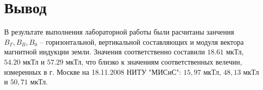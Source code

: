 \section*{Вывод}

В результате выполнения лабораторной работы были расчитаны занчения 
$ B_\Gamma, B_B, B_0 $ -- горизонтальной, вертикальной составляющих и модуля вектора магнитной индукции земли. Значения соответственно составили 
$ 18.61 $ мкТл,
$ 54.20 $ мкТл и
$ 57.29 $ мкТл,
что близко к значениям соответственных велечин,
измеренных в г. Москве на 18.11.2008 НИТУ "МИСиС":
$ 15,97 $ мкТл,
$ 48,13 $ мкТл и
$ 50,71 $ мкТл.